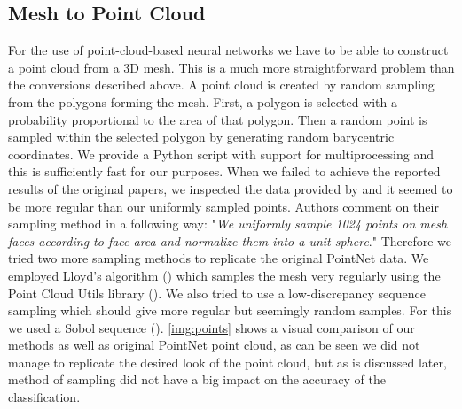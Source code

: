 \subsection{Mesh to Point Cloud}
\label{subsec:pointcloud}
For the use of point-cloud-based neural networks we have to be able to construct a point cloud from a 3D mesh. This is a much more straightforward problem than the conversions described above. A point cloud is created by random sampling from the polygons forming the mesh. First, a polygon is selected with a probability proportional to the area of that polygon. Then a random point is sampled within the selected polygon by generating random barycentric coordinates. We provide a Python script with support for multiprocessing and this is sufficiently fast for our purposes. When we failed to achieve the reported results of the original papers, we inspected the data provided by \cite{qi_pointnet_2016} and it seemed to be more regular than our uniformly sampled points. Authors comment on their sampling method in a following way: "\textit{We uniformly sample 1024 points on mesh faces according
to face area and normalize them into a unit sphere}." Therefore we tried two more sampling methods to replicate the original PointNet data. We employed Lloyd's algorithm (\cite{lloyd_least_1982}) which samples the mesh very regularly using the Point Cloud Utils library (\cite{williams_point_2019}). We also tried to use a low-discrepancy sequence sampling which should give more regular but seemingly random samples. For this we used a Sobol sequence (\cite{sobol_distribution_1967}). \autoref{img:points} shows a visual comparison of our methods as well as original PointNet point cloud, as can be seen we did not manage to replicate the desired look of the point cloud, but as is discussed later, method of sampling did not have a big impact on the accuracy of the classification.

